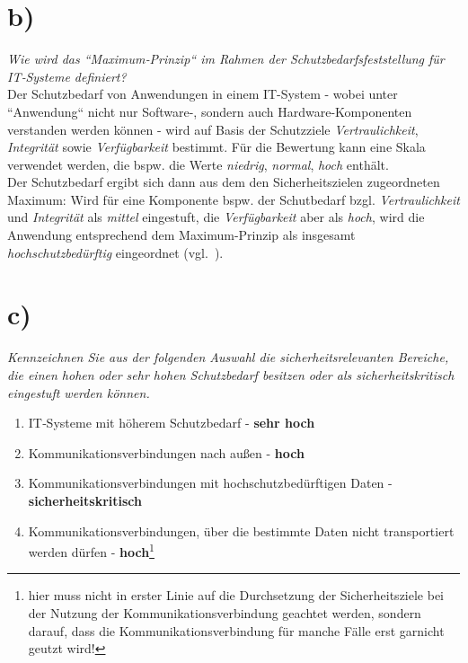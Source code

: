 \section{b)}

\textit{Wie wird das ``Maximum‐Prinzip`` im Rahmen der Schutzbedarfsfeststellung für IT‐Systeme definiert?}\\

\noindent
Der Schutzbedarf von Anwendungen in einem IT-System - wobei unter ``Anwendung`` nicht nur Software-, sondern auch Hardware-Komponenten verstanden werden können - wird auf Basis der Schutzziele \textit{Vertraulichkeit}, \textit{Integrität} sowie \textit{Verfügbarkeit} bestimmt.
Für die Bewertung kann eine Skala verwendet werden, die bspw. die Werte \textit{niedrig}, \textit{normal}, \textit{hoch} enthält.\\
Der Schutzbedarf ergibt sich dann aus dem den Sicherheitszielen zugeordneten Maximum: Wird für eine Komponente bspw. der Schutbedarf bzgl. \textit{Vertraulichkeit} und \textit{Integrität} als \textit{mittel} eingestuft, die \textit{Verfügbarkeit} aber als \textit{hoch}, wird die Anwendung entsprechend dem Maximum-Prinzip als insgesamt \textit{hochschutzbedürftig} eingeordnet (vgl.~\cite[114]{BSI200-2}).

\section{c)}

\textit{Kennzeichnen Sie aus der folgenden Auswahl die sicherheitsrelevanten Bereiche,
    die einen hohen oder sehr hohen Schutzbedarf besitzen oder als
    sicherheitskritisch eingestuft werden können.
}\\

\begin{enumerate}
    \itemsep0.5em
    \item IT‐Systeme mit höherem Schutzbedarf - \textbf{sehr hoch}
    \item Kommunikationsverbindungen nach außen  - \textbf{hoch}
    \item Kommunikationsverbindungen mit hochschutzbedürftigen Daten  - \textbf{sicherheitskritisch}
    \item Kommunikationsverbindungen, über die bestimmte Daten nicht transportiert werden dürfen  - \textbf{hoch}\footnote{hier muss nicht in erster Linie auf die Durchsetzung der Sicherheitsziele bei der Nutzung der Kommunikationsverbindung geachtet werden, sondern darauf, dass die Kommunikationsverbindung für manche Fälle erst garnicht geutzt wird!}
\end{enumerate}


